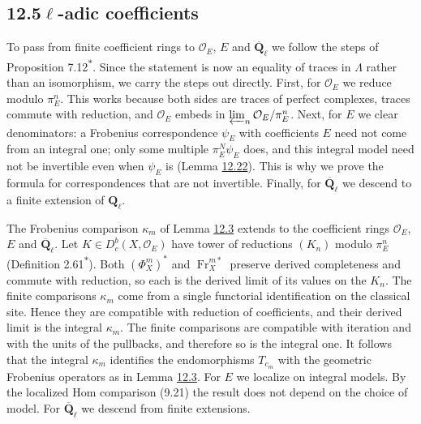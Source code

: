 \documentclass[11pt]{article}
\newcommand{\bpout}[1]{#1\textsuperscript{\hyperlink{bp-outside}{\ensuremath{\ast}}}}
\providecommand{\Dbc}{}\renewcommand{\Dbc}{D^b_c}
\begin{document}
\subsection*{\texorpdfstring{12.5\quad $\ell$-adic coefficients}{12.5 ell-adic coefficients}}
\label{bp64}%
\label{bp65}%
To pass from finite coefficient rings to \(\mathcal O_E\), \(E\) and \(\overline{\mathbf Q}_\ell\) we follow the steps of Proposition \bpout{7.12}. Since the statement is now an equality of traces in \(\Lambda\) rather than an isomorphism, we carry the steps out directly. First, for \(\mathcal O_E\) we reduce modulo \(\pi_E^n\). This works because both sides are traces of perfect complexes, traces commute with reduction, and \(\mathcal O_E\) embeds in \(\varprojlim_n\mathcal O_E/\pi_E^n\). Next, for \(E\) we clear denominators: a Frobenius correspondence \(\psi_E\) with coefficients \(E\) need not come from an integral one; only some multiple \(\pi_E^N\psi_E\) does, and this integral model need not be invertible even when \(\psi_E\) is (Lemma \hyperref[bp69]{12.22}). This is why we prove the formula for correspondences that are not invertible. Finally, for \(\overline{\mathbf Q}_\ell\) we descend to a finite extension of \(\mathbf Q_\ell\).

The Frobenius comparison \(\kappa_m\) of Lemma \hyperref[bp9]{12.3} extends to the coefficient rings \(\mathcal O_E\), \(E\) and \(\overline{\mathbf Q}_\ell\). Let \(K\in\Dbc(X,\mathcal O_E)\) have tower of reductions \((K_n)\) modulo \(\pi_E^n\) (Definition \bpout{2.61}). Both \((\Phi_X^m)^*\) and \(\operatorname{Fr}_X^{m*}\) preserve derived completeness and commute with reduction, so each is the derived limit of its values on the \(K_n\). The finite comparisons \(\kappa_m\) come from a single functorial identification on the classical site. Hence they are compatible with reduction of coefficients, and their derived limit is the integral \(\kappa_m\). The finite comparisons are compatible with iteration and with the units of the pullbacks, and therefore so is the integral one. It follows that the integral \(\kappa_m\) identifies the endomorphisms \(T_{c_m}\) with the geometric Frobenius operators as in Lemma \hyperref[bp9]{12.3}. For \(E\) we localize on integral models. By the localized Hom comparison (9.21) the result does not depend on the choice of model. For \(\overline{\mathbf Q}_\ell\) we descend from finite extensions.
\end{document}

